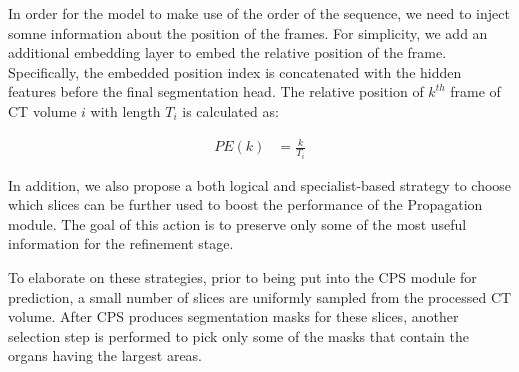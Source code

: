 In order for the model to make use of the order of the sequence, we need to inject somne information about the position of the frames. For simplicity, we add an additional embedding layer to embed the relative position of the frame. Specifically, the embedded position index is concatenated with the hidden features before the final segmentation head. The relative position of $k^{th}$ frame of CT volume $i$ with length $T_i$ is calculated as:

\begin{align}
        PE(k) &= \frac{k}{T_i}
\end{align}

In addition, we also propose a both logical and specialist-based strategy to choose which slices can be further used to boost the performance of the Propagation module. The goal of this action is to preserve only some of the most useful information for the refinement stage.

To elaborate on these strategies, prior to being put into the CPS module for prediction, a small number of slices are uniformly sampled from the processed CT volume. After CPS produces segmentation masks for these slices, another selection step is performed to pick only some of the masks that contain the organs having the largest areas.  